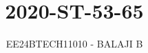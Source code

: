 \documentclass[journal]{IEEEtran}
\begin{document}

\vspace{3cm}

\title{2020-ST-53-65}
\author{EE24BTECH11010 - BALAJI B}
{\let\newpage\relax\maketitle}

\renewcommand{\thefigure}{\theenumi}
\renewcommand{\thetable}{\theenumi}
\setlength{\intextsep}{10pt} %


\renewcommand{\thetable}{\theenumi}
\end{document}
